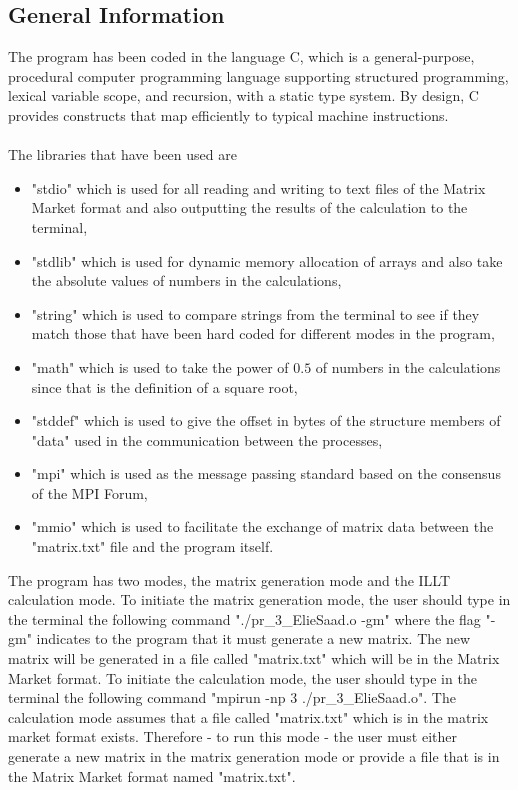 \documentclass[11pt]{article}
\theoremstyle{definition}
\begin{document}
\subsection{General Information}
The program has been coded in the language C, which is a general-purpose, procedural computer programming language supporting structured programming, lexical variable scope, and recursion, with a static type system. By design, C provides constructs that map efficiently to typical machine instructions. \\\\
The libraries that have been used are
\begin{itemize}
\item "stdio" which is used for all reading and writing to text files of the Matrix Market format and also outputting the results of the calculation to the terminal,
\item "stdlib" which is used for dynamic memory allocation of arrays and also take the absolute values of numbers in the calculations,
\item "string" which is used to compare strings from the terminal to see if they match those that have been hard coded for different modes in the program,
\item "math" which is used to take the power of $0.5$ of numbers in the calculations since that is the definition of a square root,
\item "stddef" which is used to give the offset in bytes of the structure members of "data" used in the communication between the processes,
\item "mpi" which is used as the message passing standard based on the consensus of the MPI Forum,
\item "mmio" which is used to facilitate the exchange of matrix data between the "matrix.txt" file and the program itself.
\end{itemize}
The program has two modes, the matrix generation mode and the ILLT calculation mode. To initiate the matrix generation mode, the user should type in the terminal the following command "./pr\_3\_ElieSaad.o -gm" where the flag "-gm" indicates to the program that it must generate a new matrix. The new matrix will be generated in a file called "matrix.txt" which will be in the Matrix Market format. To initiate the calculation mode, the user should type in the terminal the following command "mpirun -np 3 ./pr\_3\_ElieSaad.o". The calculation mode assumes that a file called "matrix.txt" which is in the matrix market format exists. Therefore - to run this mode - the user must either generate a new matrix in the matrix generation mode or provide a file that is in the Matrix Market format named "matrix.txt".
\end{document}
